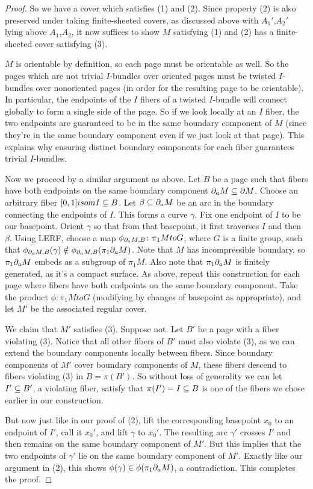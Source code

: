 \begin{proof}
So we have a cover which satisfies (1) and (2). Since property (2) is also
preserved under taking finite-sheeted covers, as discussed above with
$A_1'$,$A_2'$ lying above $A_1$,$A_2$, it now suffices to show $M$ satisfying (1)
and (2) has a finite-sheeted cover satisfying (3).

$M$ is orientable by definition, so each page must be orientable as well. So
the pages which are not trivial $I$-bundles over oriented pages must be twisted
$I$-bundles over nonoriented pages (in order for the resulting page to be
orientable). In particular, the endpoints of the $I$ fibers of a twisted
$I$-bundle will connect globally to form a single side of the page. So if we
look locally at an $I$ fiber, the two endpoints are guaranteed to be in the
same boundary component of $M$ (since they're in the same boundary component
even if we just look at that page). This explains why ensuring distinct
boundary components for each fiber guarantees trivial $I$-bundles.

Now we proceed by a similar argument as above. Let $B$ be a page such that
fibers have both endpoints on the same boundary component $\partial_a M \subseteq \partial M$.
Choose an arbitrary fiber $[0,1] isom I \subseteq B$. Let $\beta \subseteq \partial_a M$ be an arc
in the boundary connecting the endpoints of $I$. This forms a curve $\gamma$.
Fix one endpoint of $I$ to be our basepoint. Orient $\gamma$ so that from that
basepoint, it first traverses $I$ and then $\beta$. Using LERF, choose a map
$\phi_{\partial_aM,B} \colon \pi_1M to G$, where $G$ is a finite group, such that
$\phi_{\partial_aM,B}(\gamma) \notin \phi_{\partial_aM,B}(\pi_1\partial_aM)$.  Note that $M$ has
incompressible boundary, so $\pi_1\partial_aM$ embeds as a subgroup of $\pi_1M$. Also
note that $\pi_1\partial_aM$ is finitely generated, as it's a compact surface.  As
above, repeat this construction for each page where fibers have both endpoints
on the same boundary component. Take the product $\phi \colon \pi_1M to G$
(modifying by changes of basepoint as appropriate), and let $M'$ be the
associated regular cover.

We claim that $M'$ satisfies (3). Suppose not. Let $B'$ be a page with a fiber
violating (3). Notice that all other fibers of $B'$ must also violate (3), as
we can extend the boundary components locally between fibers.  Since boundary
components of $M'$ cover boundary components of $M$, these fibers descend to
fibers violating (3) in $B=\pi(B')$. So without loss of generality we can let
$I' \subseteq B'$, a violating fiber, satisfy that $\pi(I')=I \subseteq B$ is one of the
fibers we chose earlier in our construction.

But now just like in our proof of (2), lift the corresponding basepoint $x_0$ to
an endpoint of $I'$, call it $x_0'$, and lift $\gamma$ to $x_0'$. The resulting
arc $\gamma'$ crosses $I'$ and then remains on the same boundary component of
$M'$.  But this implies that the two endpoints of $\gamma'$ lie on the same
boundary component of $M'$. Exactly like our argument in (2), this shows
$\phi(\gamma) \in \phi(\pi_1\partial_aM)$, a contradiction. This completes the proof.

\end{proof}

